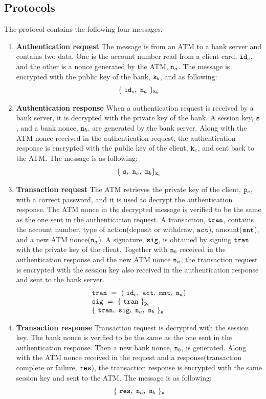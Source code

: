 \documentclass[a4paper]{report}
\newcommand{\co}[1]{$\cod{#1}$}
\begin{document}
\subsection{Protocols}
The protocol contains the following four messages.
\begin{enumerate}
\item \textbf{Authentication request} The message is from an ATM to a bank server and contains two data.
      One is the account number read from a client card, $\mathtt{id}_c$, and the other is a nonce generated by the ATM,
      $\mathtt{n}_a$. The message is encrypted with the public key of the bank, $\mathtt{k}_b$, and as following:
      \[
         \{~\mathtt{id}_c,~\mathtt{n}_a~\}_{\mathtt{k}_b}
      \]
\item \textbf{Authentication response} When a authentication request is received by a bank 
      server, it is decrypted with the private key of the bank. A session key, \co{s}, and a bank nonce, 
      $\mathtt{n}_b$, are generated by the bank server. Along with the ATM nonce received in the authentication
      request, the authentication response is encrypted with the public key of the client, $\mathtt{k}_c$,
      and sent back to the ATM. The message is as following:
      \[
         \{~\mathtt{s},~\mathtt{n}_a,~\mathtt{n}_b\}_{\mathtt{k}_c}
      \]
\item \textbf{Transaction request} The ATM retrieves the private key of the client, $\mathtt{p}_c$, with a correct 
      password, and it is used to decrypt the authentication response. The ATM nonce in the decrypted
      message is verified to be the same as the one sent in the authentication request. 
      A transaction, \co{tran}, contains the account number, type of action(deposit or withdraw, \co{act}),
      amount(\co{mnt}), and a new ATM nonce($\mathtt{n}_a$). A signature, \co{sig}, is obtained by signing 
      \co{tran} with the private key of the client. Together with $\mathtt{n}_b$ received in the authentication
      response and the new ATM nonce $\mathtt{n}_a$, the transaction request is encrypted with the session key 
      also received in the authentication
      response and sent to the bank server. 
      \[
        \begin{array}{l}
          \mathtt{tran}~=~(~\mathtt{id}_c,~\mathtt{act},~\mathtt{mnt},~\mathtt{n}_a) \\
          \mathtt{sig}~=~\{~\mathtt{tran}~\}_{\mathtt{p}_c} \\
          \{~\mathtt{tran},~\mathtt{sig},~\mathtt{n}_a,~\mathtt{n}_b~\}_{\mathtt{s}} \\
        \end{array}
      \]
\item \textbf{Transaction response} Transaction request is decrypted with the session key. The bank nonce
      is verified to be the same as the one sent in the authentication response. Then a new bank nonce,
      $\mathtt{n}_b$, is generated. Along with the ATM nonce received in the request and a response(transaction
      complete or failure, \co{res}), the transaction response is encrypted with the same session key and
      sent to the ATM.
      The message is as following:
      \[
         \{~\mathtt{res},~\mathtt{n}_a,~\mathtt{n}_b~\}_{\mathtt{s}} \\
      \]
\end{enumerate}
\end{document}
